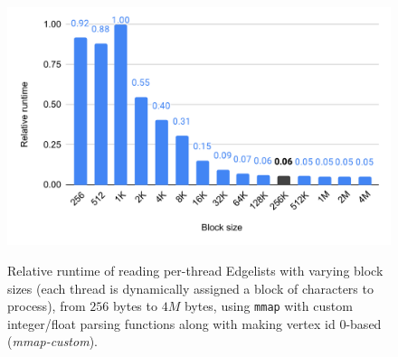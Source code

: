 \begin{figure}[hbtp]
  \centering
  \includegraphics[width=0.99\linewidth]{out/adjust-blocksize.pdf} \\[-2ex]
  \caption{Relative runtime of reading per-thread Edgelists with varying block sizes (each thread is dynamically assigned a block of characters to process), from $256$ bytes to $4M$ bytes, using \texttt{mmap} with custom integer/float parsing functions along with making vertex id 0-based (\textit{mmap-custom}).}
  \label{fig:adjust-blocksize}
\end{figure}
